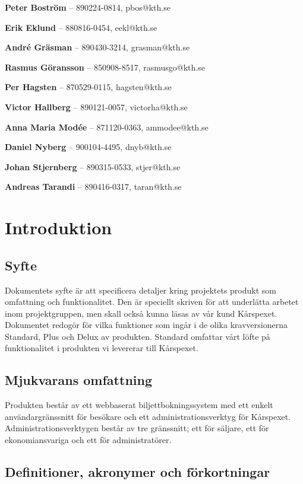 \documentclass[a4paper, twoside, 11pt, titlepage]{article}
\begin{document}
\textbf{Peter Boström} -- 890224-0814, pbos@kth.se

\textbf{Erik Eklund} -- 880816-0454, eekl@kth.se 

\textbf{André Gräsman} -- 890430-3214, grasman@kth.se 

\textbf{Rasmus Göransson} -- 850908-8517, rasmusgo@kth.se 

\textbf{Per Hagsten} -- 870529-0115, hagsten@kth.se

\textbf{Victor Hallberg} -- 890121-0057, victorha@kth.se

\textbf{Anna Maria Modée} -- 871120-0363, ammodee@kth.se 

\textbf{Daniel Nyberg} -- 900104-4495, dnyb@kth.se 

\textbf{Johan Stjernberg} -- 890315-0533, stjer@kth.se

\textbf{Andreas Tarandi} -- 890416-0317, taran@kth.se

\clearpage
\section{Introduktion}



	\subsection{Syfte}


	Dokumentets syfte är att specificera detaljer kring projektets produkt som omfattning och funktionalitet. Den är speciellt skriven för att underlätta arbetet inom projektgruppen, men skall också kunna läsas av vår kund Kårspexet. Dokumentet redogör för vilka funktioner som ingår i de olika kravversionerna Standard, Plus och Delux av produkten. Standard omfattar vårt löfte på funktionalitet i produkten vi levererar till Kårspexet.

	\subsection{Mjukvarans omfattning}


	Produkten består av ett webbaserat biljettbokningssystem med ett enkelt användargränssnitt för besökare och ett administrationsverktyg för Kårspexet. Administrationsverktygen består av tre gränssnitt; ett för säljare, ett för ekonomiansvariga och ett för administratörer.

	\subsection{Definitioner, akronymer och förkortningar}
\end{document}
